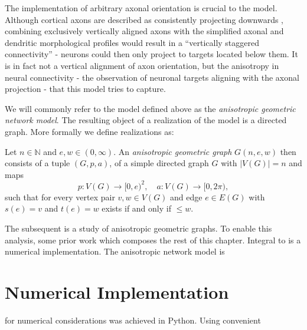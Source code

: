 The implementation of arbitrary axonal orientation is crucial to the
model. Although cortical axons are described as consistently
projecting downwards \parencite[%
cf. Section~\ref{sec:biol_anisotropy}]{Braitenberg_Cortex}, combining
exclusively vertically aligned axons with the simplified axonal and
dendritic morphological profiles would result in a \enquote{vertically
  staggered connectivity} - neurons could then only project to targets
located below them.  It is in fact not a vertical alignment of axon
orientation, but the anisotropy in neural connectivity - the
observation of neuronal targets aligning with the axonal projection -
that this model tries to capture. 

We will commonly refer to the model defined above as the
\textit{anisotropic geometric network model}. The resulting object of
a realization of the model is a directed graph. More formally we
define realizations as:

\begin{definition} 
Let $n \in \mathbb{N}$ and $e,w \in (0,\infty)$. An
\textit{anisotropic geometric graph} $G(n,e,w)$ then consists of a
tuple $(G,p,a)$, of a simple directed graph $G$ with $|V(G)|=n$ and
maps \[p:V(G)\to[0,e)^2, \quad a:V(G)\to[0,2\pi),\] such that for every
vertex pair $v,w \in V(G)$ and edge $e\in E(G)$ with $s(e)=v$ and
$t(e)=w$ exists if and only if $\le w$. %
\end{definition}


The subsequent is a study of anisotropic geometric graphs. To enable
this analysis, some prior work which composes the rest of this
chapter. Integral to is a numerical implementation. The anisotropic
network model is 





\section{Numerical Implementation}

for numerical considerations was achieved in Python. Using convenient 







